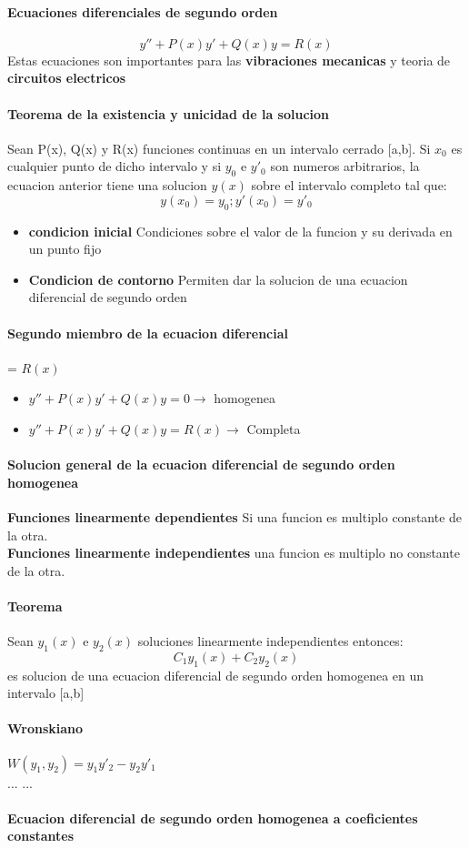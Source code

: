 \documentclass[11pt]{article}
\begin{document}
\paragraph{Ecuaciones diferenciales de segundo orden}
\begin{equation*}
	y'' + P(x)y' + Q(x)y = R(x)
\end{equation*}
Estas ecuaciones son importantes para las \textbf{vibraciones mecanicas} y teoria de \textbf{circuitos electricos}
\paragraph{Teorema de la existencia y unicidad de la solucion}
Sean P(x), Q(x) y R(x) funciones continuas en un intervalo cerrado [a,b]. Si $x_0$ es cualquier punto de dicho intervalo y si $y_0$ e $y'_0$ son numeros arbitrarios, la ecuacion anterior tiene una solucion $y(x)$ sobre el intervalo completo tal que:
\begin{equation*}
y(x_0) = y_0; y'(x_0) = y'_0
\end{equation*}
\begin{itemize}
	\item \textbf{condicion inicial} Condiciones sobre el valor de la funcion y su derivada en un punto fijo
	\item \textbf{Condicion de contorno} Permiten dar la solucion de una ecuacion diferencial de segundo orden
\end{itemize}
\paragraph{Segundo miembro de la ecuacion diferencial} = $R(x)$
\begin{itemize}
	\item $y'' + P(x)y' + Q(x)y = 0 \rightarrow$ homogenea
	\item $y'' + P(x)y' + Q(x)y = R(x) \rightarrow$ Completa
\end{itemize}
\paragraph{Solucion general de la ecuacion diferencial de segundo orden homogenea}
\textbf{Funciones linearmente dependientes} Si una funcion es multiplo constante de la otra.\\
\textbf{Funciones linearmente independientes} una funcion es multiplo no constante de la otra.\\
\paragraph{Teorema}
Sean $y_1(x)$ e $y_2(x)$ soluciones linearmente independientes entonces:
\begin{equation*}
	C_1y_1(x) + C_2y_2(x)
\end{equation*}
es solucion de una ecuacion diferencial de segundo orden homogenea en un intervalo [a,b]
\paragraph{Wronskiano} 
$W(y_1,y_2) = y_1y'_2 - y_2y'_1$\\
\linebreak
...
\linebreak
...
\linebreak
\paragraph{Ecuacion diferencial de segundo orden homogenea a coeficientes constantes}
\end{document}
